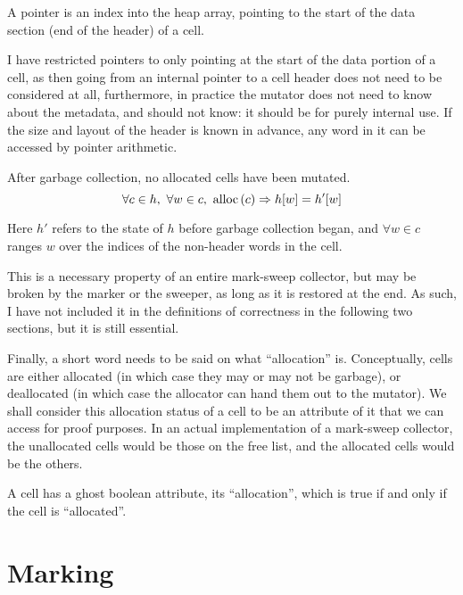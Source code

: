 \begin{definition}[Pointer]
  \label{def:ms-pointer}
  A pointer is an index into the heap array, pointing to the start of
  the data section (end of the header) of a cell.
\end{definition}

I have restricted \glspl{pointer} to only pointing at the start of the
data portion of a \gls{cell}, as then going from an internal
\gls{pointer} to a cell header does not need to be considered at all,
furthermore, in practice the \gls{mutator} does not need to know about
the metadata, and should not know: it should be for purely internal
use. If the size and layout of the header is known in advance, any
word in it can be accessed by \gls{pointer} arithmetic.

\begin{definition}
  \label{def:ms-word-preservation}
  After garbage collection, no allocated cells have been mutated.
   \[\forall c \in h,\ \forall w \in c,\ \mathrm{alloc}\left(c\right) \Rightarrow h[w] =
   h'[w]\]

   Here $h'$ refers to the state of $h$ before garbage collection
   began, and $\forall w \in c$ ranges $w$ over the indices of the
   non-header words in the cell.
\end{definition}

This is a necessary property of an entire mark-sweep collector, but
may be broken by the marker or the sweeper, as long as it is restored
at the end. As such, I have not included it in the definitions of
correctness in the following two sections, but it is still essential.

Finally, a short word needs to be said on what ``allocation''
is. Conceptually, cells are either allocated (in which case they may
or may not be garbage), or deallocated (in which case the allocator
can hand them out to the mutator). We shall consider this allocation
status of a cell to be an attribute of it that we can access for proof
purposes. In an actual implementation of a mark-sweep collector, the
unallocated cells would be those on the free list, and the allocated
cells would be the others.

\begin{definition}[Allocation]
  \label{def:ms-allocation}
  A cell has a ghost boolean attribute, its ``allocation'', which is
  true if and only if the cell is ``allocated''.
\end{definition}

\section{Marking}
\label{sec:marksweep-marking}

